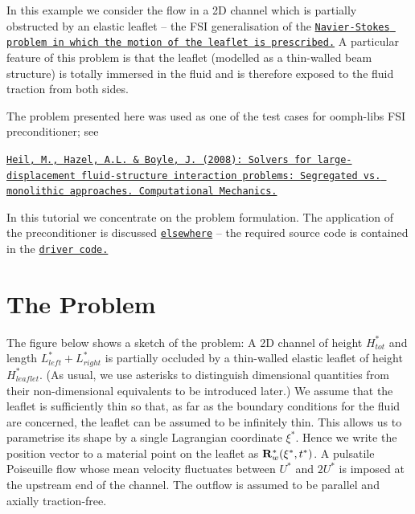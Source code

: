 In this example we consider the flow in a 2D channel which is partially obstructed by an elastic leaflet -- the F\+SI generalisation of the \href{../../../navier_stokes/channel_with_leaflet/html/index.html}{\tt Navier-\/\+Stokes problem in which the motion of the leaflet is prescribed.} A particular feature of this problem is that the leaflet (modelled as a thin-\/walled beam structure) is totally immersed in the fluid and is therefore exposed to the fluid traction from both sides.

The problem presented here was used as one of the test cases for {\ttfamily oomph-\/lib\textquotesingle{}s} F\+SI preconditioner; see ~\newline
~\newline
 \begin{center} \href{http://www.maths.man.ac.uk/~mheil/oomph_lib_additional_material/HeilHazelBoyleCompMech/HeilHazelBoyleCompMech.pdf}{\tt Heil, M., Hazel, A.\+L. \& Boyle, J. (2008)\+: Solvers for large-\/displacement fluid-\/structure interaction problems\+: Segregated vs. monolithic approaches. Computational Mechanics.} \end{center} 

In this tutorial we concentrate on the problem formulation. The application of the preconditioner is discussed \href{../../../preconditioners/fsi/html/index.html}{\tt elsewhere} -- the required source code is contained in the \href{../../../../demo_drivers/interaction/fsi_channel_with_leaflet/fsi_channel_with_leaflet.cc}{\tt driver code.}



 

\hypertarget{index_the_problem}{}\section{The Problem}\label{index_the_problem}
The figure below shows a sketch of the problem\+: A 2D channel of height $ H^*_{tot}$ and length $ L^*_{left} + L^*_{right} $ is partially occluded by a thin-\/walled elastic leaflet of height $ H^*_{leaflet} $. (As usual, we use asterisks to distinguish dimensional quantities from their non-\/dimensional equivalents to be introduced later.) We assume that the leaflet is sufficiently thin so that, as far as the boundary conditions for the fluid are concerned, the leaflet can be assumed to be infinitely thin. This allows us to parametrise its shape by a single Lagrangian coordinate $ \xi^* $. Hence we write the position vector to a material point on the leaflet as $ {\bf R}^*_w(\xi^*,t^*) $. A pulsatile Poiseuille flow whose mean velocity fluctuates between $ U^* $ and $ 2 U^* $ is imposed at the upstream end of the channel. The outflow is assumed to be parallel and axially traction-\/free.

